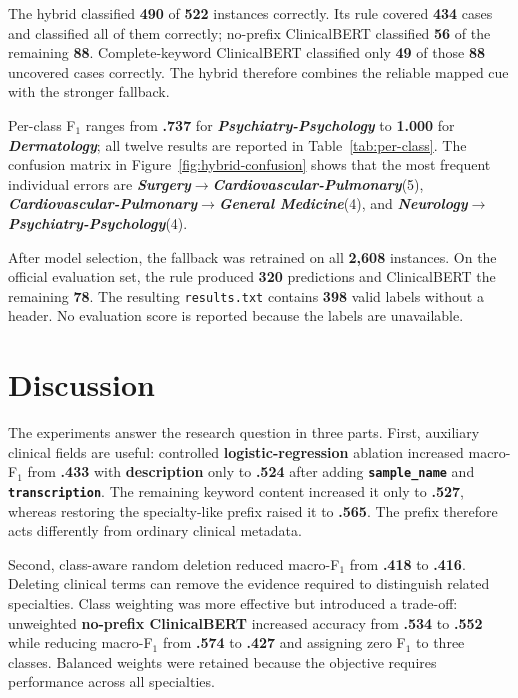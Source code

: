 \documentclass[twocolumn,10pt]{article}
\begin{document}
The hybrid classified \textbf{490} of \textbf{522} instances correctly. Its rule covered \textbf{434} cases and classified all of them correctly; no-prefix ClinicalBERT classified \textbf{56} of the remaining \textbf{88}. Complete-keyword ClinicalBERT classified only \textbf{49} of those \textbf{88} uncovered cases correctly. The hybrid therefore combines the reliable mapped cue with the stronger fallback.

Per-class F$_1$ ranges from \textbf{.737} for \textbf{\textit{Psychiatry-Psychology}} to \textbf{1.000} for \textbf{\textit{Dermatology}}; all twelve results are reported in Table~\ref{tab:per-class}. The confusion matrix in Figure~\ref{fig:hybrid-confusion} shows that the most frequent individual errors are \textbf{\textit{Surgery}$\rightarrow$\textit{Cardiovascular-Pulmonary}}(5), \textbf{\textit{Cardiovascular-Pulmonary}$\rightarrow$\textit{General Medicine}}(4), and \textbf{\textit{Neurology}$\rightarrow$\textit{Psychiatry-Psychology}}(4).

After model selection, the fallback was retrained on all \textbf{2,608} instances. On the official evaluation set, the rule produced \textbf{320} predictions and ClinicalBERT the remaining \textbf{78}. The resulting \texttt{results.txt} contains \textbf{398} valid labels without a header. No evaluation score is reported because the labels are unavailable.
\vspace{-0.45cm}

\section*{\vspace{-0.35cm}Discussion} 

The experiments answer the research question in three parts. First, auxiliary clinical fields are useful: controlled \textbf{logistic-regression} ablation increased macro-F$_1$ from \textbf{.433} with \textbf{description} only to \textbf{.524} after adding \textbf{\texttt{sample\_name}} and \textbf{\texttt{transcription}}. The remaining keyword content increased it only to \textbf{.527}, whereas restoring the specialty-like prefix raised it to \textbf{.565}. The prefix therefore acts differently from ordinary clinical metadata.

Second, class-aware random deletion reduced macro-F$_1$ from \textbf{.418} to \textbf{.416}. Deleting clinical terms can remove the evidence required to distinguish related specialties. Class weighting was more effective but introduced a trade-off: unweighted \textbf{no-prefix ClinicalBERT} increased accuracy from \textbf{.534} to \textbf{.552} while reducing macro-F$_1$ from \textbf{.574} to \textbf{.427} and assigning zero F$_1$ to three classes. Balanced weights were retained because the objective requires performance across all specialties.
\end{document}
